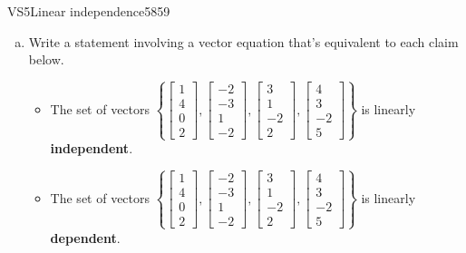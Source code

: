 \begin{exercise}{VS5}{Linear independence}{5859} 
\begin{exerciseStatement} 

\begin{enumerate}[(a)]
\item  

 Write a statement involving a vector equation that's equivalent to each claim below. 

 

\begin{itemize}
\item  

 The set of vectors \(\left\{ \left[\begin{array}{c}
1 \\
4 \\
0 \\
2
\end{array}\right] , \left[\begin{array}{c}
-2 \\
-3 \\
1 \\
-2
\end{array}\right] , \left[\begin{array}{c}
3 \\
1 \\
-2 \\
2
\end{array}\right] , \left[\begin{array}{c}
4 \\
3 \\
-2 \\
5
\end{array}\right] \right\}\) is linearly \textbf{independent}. 

 
\item  

 The set of vectors \(\left\{ \left[\begin{array}{c}
1 \\
4 \\
0 \\
2
\end{array}\right] , \left[\begin{array}{c}
-2 \\
-3 \\
1 \\
-2
\end{array}\right] , \left[\begin{array}{c}
3 \\
1 \\
-2 \\
2
\end{array}\right] , \left[\begin{array}{c}
4 \\
3 \\
-2 \\
5
\end{array}\right] \right\}\) is linearly \textbf{dependent}. 


\end{itemize}
\end{enumerate}
\end{exerciseStatement}
\end{exercise}

